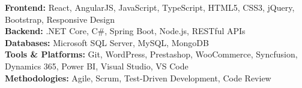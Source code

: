 \documentclass[9pt]{developercv} %
\begin{document}
\hfill %
\begin{minipage}[t]{0.25\textwidth} %
	\vspace{-\baselineskip} %
	
	\\
	\\
	\\	
\end{minipage}
\hfill %
\begin{minipage}[t]{0.3\textwidth} %
	\vspace{-\baselineskip} %
	
	\\
	\\
\end{minipage}

\vspace{0.2cm} %



\textbf{Frontend:} React, AngularJS, JavaScript, TypeScript, HTML5, CSS3, jQuery, Bootstrap, Responsive Design\\
\textbf{Backend:} .NET Core, C\#, Spring Boot, Node.js, RESTful APIs\\
\textbf{Databases:} Microsoft SQL Server, MySQL, MongoDB\\
\textbf{Tools \& Platforms:} Git, WordPress, Prestashop, WooCommerce, Syncfusion, Dynamics 365, Power BI, Visual Studio, VS Code\\
\textbf{Methodologies:} Agile, Scrum, Test-Driven Development, Code Review

\vspace{0.15cm}

\end{document}
